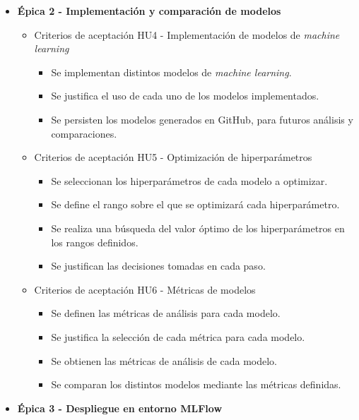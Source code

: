 \documentclass[
11pt, %
]{charter}
\begin{document}
\begin{itemize}
\begin{itemize}
\begin{itemize}
        \end{itemize}
    \end{itemize}
  \item \textbf{\'{E}pica 2 - Implementación y comparación de modelos}
    \begin{itemize}
      \item Criterios de aceptación HU4 - Implementación de modelos de \textit{machine learning}
        \begin{itemize}
            \item Se implementan distintos modelos de \textit{machine learning}.
            \item Se justifica el uso de cada uno de los modelos implementados.
            \item Se persisten los modelos generados en GitHub, para futuros análisis y comparaciones.
        \end{itemize}
      \item Criterios de aceptación HU5 - Optimización de hiperparámetros
        \begin{itemize}
            \item Se seleccionan los hiperparámetros de cada modelo a optimizar.
            \item Se define el rango sobre el que se optimizará cada hiperparámetro.
            \item Se realiza una búsqueda del valor óptimo de los hiperparámetros en los rangos definidos.
            \item Se justifican las decisiones tomadas en cada paso.
        \end{itemize}
\newpage
      \item Criterios de aceptación HU6 - Métricas de modelos
        \begin{itemize}
            \item Se definen las métricas de análisis para cada modelo.
            \item Se justifica la selección de cada métrica para cada modelo.
            \item Se obtienen las métricas de análisis de cada modelo.
            \item Se comparan los distintos modelos mediante las métricas definidas.
        \end{itemize}
    \end{itemize}
  \item \textbf{\'{E}pica 3 - Despliegue en entorno MLFlow}
    \begin{itemize}

\end{itemize}
\end{itemize}
\end{document}
